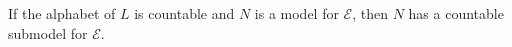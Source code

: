 If the alphabet of $L$ is countable and $N$ is a model for $\mathcal{E}$, then $N$ has a countable submodel for $\mathcal{E}$.
